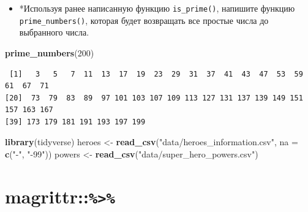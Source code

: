 \documentclass[
]{book}
\newenvironment{Shaded}{\begin{snugshade}}{\end{snugshade}}
\newcommand{\ControlFlowTok}[1]{\textcolor[rgb]{0.13,0.29,0.53}{\textbf{#1}}}
\newcommand{\DataTypeTok}[1]{\textcolor[rgb]{0.13,0.29,0.53}{#1}}
\newcommand{\DecValTok}[1]{\textcolor[rgb]{0.00,0.00,0.81}{#1}}
\newcommand{\KeywordTok}[1]{\textcolor[rgb]{0.13,0.29,0.53}{\textbf{#1}}}
\newcommand{\NormalTok}[1]{#1}
\newcommand{\OperatorTok}[1]{\textcolor[rgb]{0.81,0.36,0.00}{\textbf{#1}}}
\newcommand{\StringTok}[1]{\textcolor[rgb]{0.31,0.60,0.02}{#1}}
\providecommand{\tightlist}{%
  \setlength{\itemsep}{0pt}\setlength{\parskip}{0pt}}
\begin{document}
\begin{itemize}
\tightlist
\item
  *Используя ранее написанную функцию \texttt{is\_prime()}, напишите функцию \texttt{prime\_numbers()}, которая будет возвращать все простые числа до выбранного числа.
\end{itemize}

\begin{Shaded}
\end{Shaded}

\begin{Shaded}
\begin{Highlighting}[]
\KeywordTok{prime_numbers}\NormalTok{(}\DecValTok{200}\NormalTok{)}
\end{Highlighting}
\end{Shaded}

\begin{verbatim}
 [1]   3   5   7  11  13  17  19  23  29  31  37  41  43  47  53  59  61  67  71
[20]  73  79  83  89  97 101 103 107 109 113 127 131 137 139 149 151 157 163 167
[39] 173 179 181 191 193 197 199
\end{verbatim}

\begin{Shaded}
\begin{Highlighting}[]
\KeywordTok{library}\NormalTok{(tidyverse)}
\NormalTok{heroes <-}\StringTok{ }\KeywordTok{read_csv}\NormalTok{(}\StringTok{"data/heroes_information.csv"}\NormalTok{,}
                   \DataTypeTok{na =} \KeywordTok{c}\NormalTok{(}\StringTok{"-"}\NormalTok{, }\StringTok{"-99"}\NormalTok{))}
\NormalTok{powers <-}\StringTok{ }\KeywordTok{read_csv}\NormalTok{(}\StringTok{"data/super_hero_powers.csv"}\NormalTok{)}
\end{Highlighting}
\end{Shaded}

\hypertarget{solution_pipe}{%
\section{\texorpdfstring{magrittr::\texttt{\%\textgreater{}\%}}{magrittr::\%\textgreater\%}}\label{solution_pipe}}
\end{document}
